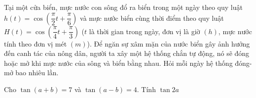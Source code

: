\begin{bt}%
	Tại một cửa biển, mực nước con sông đổ ra biển trong một ngày theo quy luật $h(t)=\cos \left(\dfrac{\pi}{2} t+\dfrac{\pi}{6}\right)$ và mực nước biển cùng thời điểm theo quy luật $H(t)=\cos \left(\dfrac{\pi}{4} t+\dfrac{\pi}{3}\right)$ ($t$ là thời gian trong ngày, đơn vị là giờ $(h)$, mực nước tính theo đơn vị mét $(m)$). Để ngăn sự xâm mặn của nước biển gây ảnh hưởng đến canh tác của nông dân, người ta xây một hệ thống chắn tự động, nó sẽ đóng hoặc mở khi mực nước của sông và biển bằng nhau. Hỏi mỗi ngày hệ thống đóng-mở bao nhiêu lần.
\end{bt}

\begin{bt}%
	Cho $\tan \left(a+b\right)=7$ và $\tan \left(a-b\right)=4$. Tính $\tan 2a$
\end{bt}

